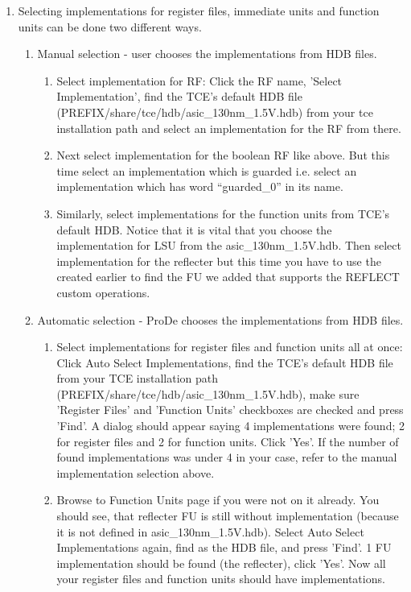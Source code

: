 \documentclass[twoside]{tceusermanual}
\begin{document}
\begin{enumerate}
\item%
Selecting implementations for register files, immediate units and function
units can be done two different ways.

\begin{enumerate}
\item%
Manual selection - user chooses the implementations from HDB files.

\begin{enumerate}
\item%
Select implementation for RF: Click the RF name, 'Select Implementation',
find the TCE's default HDB file (PREFIX/share/tce/hdb/asic\_130nm\_1.5V.hdb) 
from your tce installation path and select an implementation for the RF from 
there.

\item%
Next select implementation for the boolean RF like above. But this time
select an implementation which is guarded i.e. select an implementation which
has word ``guarded\_0'' in its name.

\item%
Similarly, select implementations for the function units from TCE's default
HDB. Notice that it is vital that you choose the implementation for LSU from
the asic\_130nm\_1.5V.hdb. Then select implementation for the reflecter but
this time you have to use the  created earlier to find the FU
we added that supports the REFLECT custom operations.
\end{enumerate}

\item%
Automatic selection - ProDe chooses the implementations from HDB files.

\begin{enumerate}
\item%
Select implementations for register files and function units all at once: 
Click Auto Select Implementations, find the TCE's default HDB file from your 
TCE installation path (PREFIX/share/tce/hdb/asic\_130nm\_1.5V.hdb), make sure
'Register Files' and 'Function Units' checkboxes are checked and press 'Find'.
A dialog should appear saying 4 implementations were found; 2 for register
files and 2 for function units. Click 'Yes'. If the number of found
implementations was under 4 in your case, refer to the manual implementation 
selection above.

\item%
Browse to Function Units page if you were not on it already. You should see, 
that reflecter FU is still without implementation (because it is not defined 
in asic\_130nm\_1.5V.hdb). Select Auto Select Implementations again, find 
 as the HDB file, and press 'Find'. 1 FU implementation should
be found (the reflecter), click 'Yes'. Now all your register files and 
function units should have implementations.
\end{enumerate}


\end{enumerate}
\end{enumerate}
\end{document}
